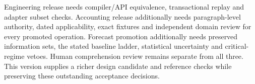 Engineering release needs compiler/API equivalence, transactional replay and
adapter subset checks. Accounting release additionally needs paragraph-level
authority, dated applicability, exact fixtures and independent domain review
for every promoted operation. Forecast promotion additionally needs preserved
information sets, the stated baseline ladder, statistical uncertainty and
critical-regime vetoes. Human comprehension review remains separate from all
three. This version supplies a richer design candidate and reference
checks while preserving these outstanding acceptance decisions.

